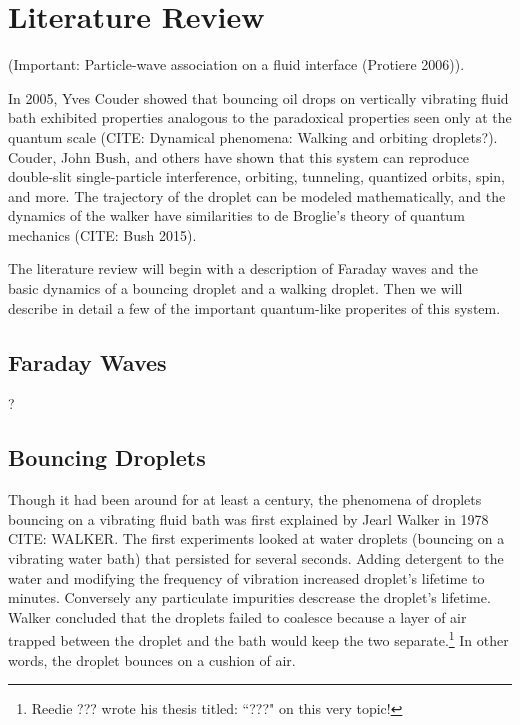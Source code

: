	\section{Literature Review}
	
(Important: Particle-wave association on a fluid interface (Protiere 2006)).
	    
	    In 2005, Yves Couder showed that bouncing oil drops on vertically vibrating fluid bath exhibited properties analogous to the paradoxical properties seen only at the quantum scale (CITE: Dynamical phenomena:  Walking and orbiting droplets?). Couder, John Bush, and others have shown that this system can reproduce double-slit single-particle interference, orbiting, tunneling, quantized orbits, spin, and more. The trajectory of the droplet can be modeled mathematically, and the dynamics of the walker have similarities to de Broglie's theory of quantum mechanics (CITE: Bush 2015).
	    
	    The literature review will begin with a description of Faraday waves and the basic dynamics of a bouncing droplet and a walking droplet. Then we will describe in detail a few of the important quantum-like properites of this system. 
	    
	    	    \subsection{Faraday Waves}
	    
	    
	?

	    
	    \subsection{Bouncing Droplets}
	    Though it had been around for at least a century, the phenomena of droplets bouncing on a vibrating fluid bath was first explained by Jearl Walker in 1978 CITE: WALKER. The first experiments looked at water droplets (bouncing on a vibrating water bath) that persisted for several seconds. Adding detergent to the water and modifying the frequency of vibration increased droplet's lifetime to minutes. Conversely any particulate impurities descrease the droplet's lifetime. Walker concluded that the droplets failed to coalesce because a layer of air trapped between the droplet and the bath would keep the two separate.\footnote{Reedie ??? wrote his thesis titled: ``???" on this very topic! } In other words, the droplet bounces on a cushion of air.
	        

